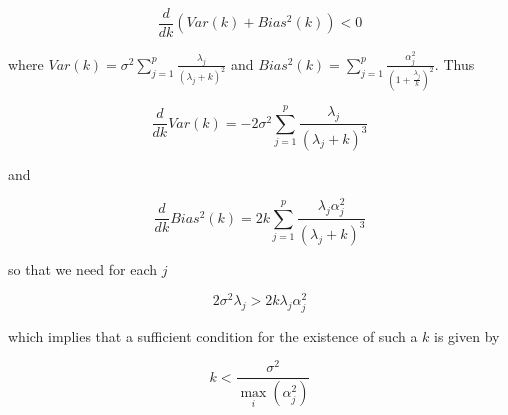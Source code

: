 $$\frac{d}{dk}( Var(k) + Bias^2(k)) < 0$$

where $Var(k) = \sigma^2 \sum_{j=1}^p \frac{\lambda_j}{(\lambda_j + k)^2}$ and $Bias^2(k) =  \sum_{j=1}^p \frac{\alpha_j^2}{\left( 1 + \frac{\lambda_j}{k} \right)^2 }$. Thus

$$\frac{d}{dk} Var(k) = -2 \sigma^2 \sum_{j=1}^p \frac{\lambda_j}{(\lambda_j + k)^3}$$

and

$$\frac{d}{dk} Bias^2(k) = 2k\sum_{j=1}^p \frac{\lambda_j \alpha_j^2}{(\lambda_j + k)^3}$$


so that we need for each $j$

$$2 \sigma^2 \lambda_j > 2k \lambda_j \alpha_j^2$$

which implies that a sufficient condition for the existence of such a $k$ is given by

$$k < \frac{\sigma^2}{\max_i (\alpha_j^2)}$$









